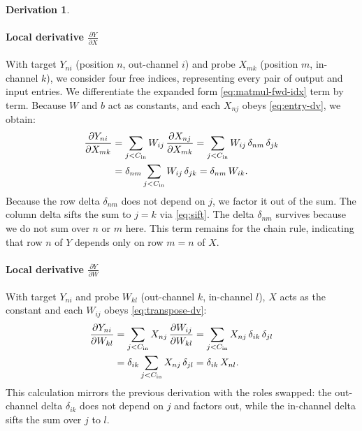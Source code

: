 \documentclass[letterpaper, 10 pt, conference]{ieeeconf}
\newcommand{\pdv}[2]{\frac{\partial #1}{\partial #2}}
\newcommand{\kron}[2]{\delta_{#1 #2}}
\theoremstyle{definition}
\newtheorem*{derivation}{Derivation}
\begin{document}
\begin{derivation}
  \paragraph{Local derivative $\pdv{Y}{X}$}
  With target $Y_{ni}$ (position $n$, out-channel $i$) and probe $X_{mk}$ (position $m$, in-channel $k$), we consider four free indices, representing every pair of output and input entries. We differentiate the expanded form \eqref{eq:matmul-fwd-idx} term by term. Because $W$ and $b$ act as constants, and each $X_{nj}$ obeys \eqref{eq:entry-dv}, we obtain:
  \begin{align}
    \pdv{Y_{ni}}{X_{mk}}
     & = \sum_{j<C_{\text{in}}} W_{ij}\,\pdv{X_{nj}}{X_{mk}}
    = \sum_{j<C_{\text{in}}} W_{ij}\,\kron{n}{m}\,\kron{j}{k} \notag \\
     & = \kron{n}{m} \sum_{j<C_{\text{in}}} W_{ij}\,\kron{j}{k}
    = \kron{n}{m}\,W_{ik}.
    \label{eq:matmul-dydx}
  \end{align}
  Because the row delta $\kron{n}{m}$ does not depend on $j$, we factor it out of the sum. The column delta sifts the sum to $j = k$ via \eqref{eq:sift}. The delta $\kron{n}{m}$ survives because we do not sum over $n$ or $m$ here. This term remains for the chain rule, indicating that row $n$ of $Y$ depends only on row $m = n$ of $X$.

  \paragraph{Local derivative $\pdv{Y}{W}$}
  With target $Y_{ni}$ and probe $W_{kl}$ (out-channel $k$, in-channel $l$), $X$ acts as the constant and each $W_{ij}$ obeys \eqref{eq:transpose-dv}:
  \begin{align}
    \pdv{Y_{ni}}{W_{kl}}
     & = \sum_{j<C_{\text{in}}} X_{nj}\,\pdv{W_{ij}}{W_{kl}}
    = \sum_{j<C_{\text{in}}} X_{nj}\,\kron{i}{k}\,\kron{j}{l} \notag \\
     & = \kron{i}{k} \sum_{j<C_{\text{in}}} X_{nj}\,\kron{j}{l}
    = \kron{i}{k}\,X_{nl}.
    \label{eq:matmul-dydw}
  \end{align}
  This calculation mirrors the previous derivation with the roles swapped: the out-channel delta $\kron{i}{k}$ does not depend on $j$ and factors out, while the in-channel delta sifts the sum over $j$ to $l$.


\end{derivation}
\end{document}
